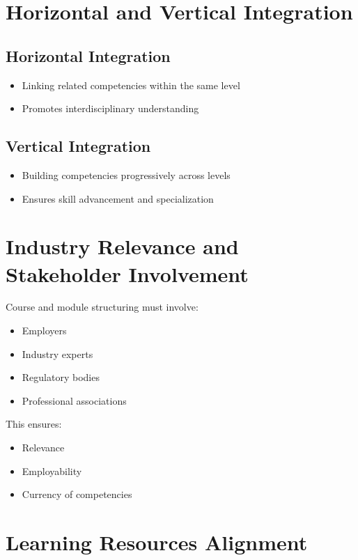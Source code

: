 \documentclass[12pt]{article}
\begin{document}
\section{Horizontal and Vertical Integration}

\subsection{Horizontal Integration}

\begin{itemize}
    \item Linking related competencies within the same level
    \item Promotes interdisciplinary understanding
\end{itemize}

\subsection{Vertical Integration}

\begin{itemize}
    \item Building competencies progressively across levels
    \item Ensures skill advancement and specialization
\end{itemize}

\section{Industry Relevance and Stakeholder Involvement}

Course and module structuring must involve:

\begin{itemize}
    \item Employers
    \item Industry experts
    \item Regulatory bodies
    \item Professional associations
\end{itemize}

This ensures:

\begin{itemize}
    \item Relevance
    \item Employability
    \item Currency of competencies
\end{itemize}

\section{Learning Resources Alignment}
\end{document}
